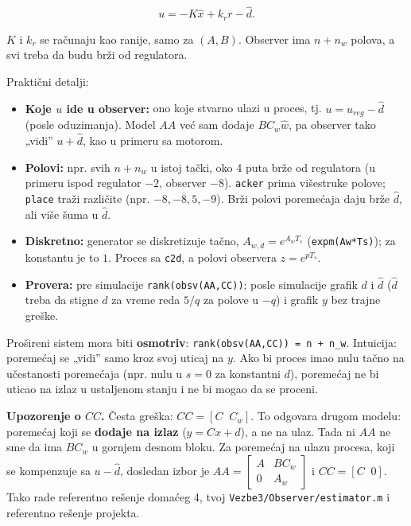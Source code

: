 \documentclass[11pt,a4paper,parskip=half,headsepline,numbers=noenddot]{scrartcl}
\begin{document}
\[u = -K\hat x + k_rr - \hat d .\]

\(K\) i \(k_r\) se računaju kao ranije, samo za \((A, B)\). Observer ima \(n + n_w\) polova, a svi treba da budu brži od regulatora.

Praktični detalji:

\begin{itemize}
\item \textbf{Koje \(u\) ide u observer:} ono koje stvarno ulazi u proces, tj. \(u = u_{reg} - \hat d\) (posle oduzimanja). Model \(AA\) već sam dodaje \(BC_w\hat w\), pa observer tako „vidi'' \(u + \hat d\), kao u primeru sa motorom.
\item \textbf{Polovi:} npr. svih \(n + n_w\) u istoj tački, oko 4 puta brže od regulatora (u primeru ispod regulator \(-2\), observer \(-8\)). \texttt{acker} prima višestruke polove; \texttt{place} traži različite (npr. \(-8, -8{,}5, -9\)). Brži polovi poremećaja daju brže \(\hat d\), ali više šuma u \(\hat d\).
\item \textbf{Diskretno:} generator se diskretizuje tačno, \(A_{w,d} = e^{A_wT_s}\) (\texttt{expm(\allowbreak{}Aw*Ts)}); za konstantu je to \(1\). Proces sa \texttt{c2d}, a polovi observera \(z = e^{pT_s}\).
\item \textbf{Provera:} pre simulacije \texttt{rank(\allowbreak{}obsv(\allowbreak{}AA,\allowbreak{}CC))}; posle simulacije grafik \(d\) i \(\hat d\) (\(\hat d\) treba da stigne \(d\) za vreme reda \(5/q\) za polove u \(-q\)) i grafik \(y\) bez trajne greške.
\end{itemize}

\begin{kljucna}
Prošireni sistem mora biti \textbf{osmotriv}: \texttt{rank(\allowbreak{}obsv(\allowbreak{}AA,\allowbreak{}CC))\ =\ n\ +\ n\_\allowbreak{}w}. Intuicija: poremećaj se „vidi'' samo kroz svoj uticaj na \(y\). Ako bi proces imao nulu tačno na učestanosti poremećaja (npr. nulu u \(s = 0\) za konstantni \(d\)), poremećaj ne bi uticao na izlaz u ustaljenom stanju i ne bi mogao da se proceni.
\end{kljucna}

\textbf{Upozorenje o \(CC\).} Česta greška: \(CC = [C\;\; C_w]\). To odgovara drugom modelu: poremećaj koji se \textbf{dodaje na izlaz} (\(y = Cx + d\)), a ne na ulaz. Tada ni \(AA\) ne sme da ima \(BC_w\) u gornjem desnom bloku. Za poremećaj na ulazu procesa, koji se kompenzuje sa \(u - \hat d\), dosledan izbor je \(AA = \begin{bmatrix}A & BC_w\\ 0 & A_w\end{bmatrix}\) i \(CC = [C\;\; 0]\). Tako rade referentno rešenje domaćeg 4, tvoj \texttt{Vezbe3/\allowbreak{}Observer/\allowbreak{}estimator.m} i referentno rešenje projekta.
\end{document}
